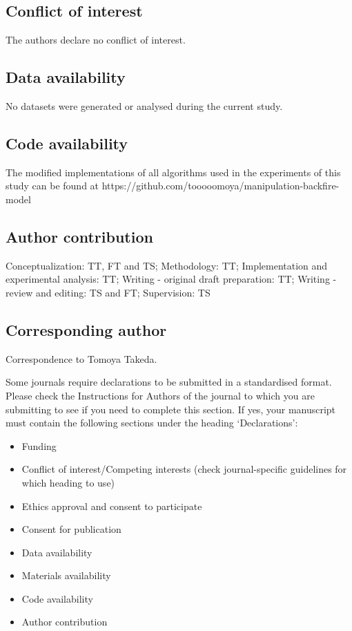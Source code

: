 \documentclass[pdflatex,sn-mathphys-num]{sn-jnl}%
\theoremstyle{thmstyleone}%
\theoremstyle{thmstyletwo}%
\theoremstyle{thmstylethree}%
\begin{document}
\subsection*{Conflict of interest}
The authors declare no conflict of interest.
\subsection*{Data availability}
No datasets were generated or analysed during the current study.
\subsection*{Code availability}
The modified implementations of all algorithms
used in the experiments of this study can be found at https://github.com/tooooomoya/manipulation-backfire-model
\subsection*{Author contribution}
Conceptualization: TT, FT and TS; Methodology: TT;
Implementation and experimental analysis: TT; Writing - original
draft preparation: TT; Writing - review and editing: TS and FT;
Supervision: TS
\subsection*{Corresponding author}
Correspondence to Tomoya Takeda.




\iffalse
  Some journals require declarations to be submitted in a standardised format. Please check the Instructions for Authors of the journal to which you are submitting to see if you need to complete this section. If yes, your manuscript must contain the following sections under the heading `Declarations':

\begin{itemize}
\item Funding
\item Conflict of interest/Competing interests (check journal-specific guidelines for which heading to use)
\item Ethics approval and consent to participate
\item Consent for publication
\item Data availability 
\item Materials availability
\item Code availability 
\item Author contribution
\end{itemize}
\end{document}
